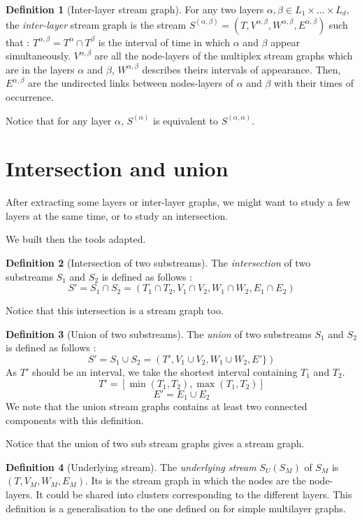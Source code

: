 \documentclass[dvipsnames,a4paper,11pt]{article}
\theoremstyle{definition}
\newtheorem{defn}{Definition}
\theoremstyle{remark}
\theoremstyle{remark}
\begin{document}
	
	\begin{defn}[Inter-layer stream graph]	
	For any two layers $\alpha, \beta \in L_1\times \dots\times L_d$, the {\em inter-layer} stream graph is the stream $S^{(\alpha,\beta)} = (T, V^{\alpha,\beta},W^{\alpha,\beta},E^{\alpha,\beta})$ such that : $T^{\alpha,\beta}=T^{\alpha}\cap T^{\beta}$ is the interval of time in which $\alpha$ and $\beta$ appear simultaneously. $V^{\alpha,\beta}$ are all the node-layers of the multiplex stream graphs which are in the layers $\alpha$ and $\beta$, $W^{\alpha,\beta}$ describes theirs intervals of appearance. Then, $E^{\alpha,\beta}$ are the undirected links between nodes-layers of $\alpha$ and $\beta$ with their times of occurrence.
	\end{defn}
	
	Notice that for any layer $\alpha$, $S^{(\alpha)}$ is equivalent to $S^{(\alpha,\alpha)}$.

	\section{Intersection and union}
	
	After extracting some layers or inter-layer graphs, we might want to study a few layers at the same time, or to study an intersection.
	
	We built then the tools adapted.
	
	\begin{defn}[Intersection of two substreams]
	The {\em intersection} of two substreams $S_1$ and $S_2$ is defined as follows :
	\[
		S' = S_1 \cap S_2 = (T_1\cap T_2, V_1 \cap V_2, W_1 \cap W_2, E_1\cap E_2)
	\]
	\end{defn}
	
	Notice that this intersection is a stream graph too.

	\begin{defn}[Union of two substreams]
	The {\em union} of two substreams $S_1$ and $S_2$ is defined as follows :
	\[
		S' = S_1 \cup S_2 = (T', V_1 \cup V_2, W_1 \cup W_2, E' \})
	\]
	As $T'$ should be an interval, we take the shortest interval containing $T_1$ and $T_2$.
	\[
		T' = [\min(T_1,T_2),\max(T_1,T_2)]
	\]
	\[
		E' = E_1 \cup E_2 
	\]
	We note that the union stream graphs contains at least two connected components with this definition.
	
	Notice that the union of two sub stream graphs gives a stream graph.
	\end{defn}
	
	
	\begin{defn}[Underlying stream]
		The {\em underlying stream } $S_U(S_M)$ of $S_M$ is $(T,V_M,W_M,E_M)$. Its is the stream graph in which the nodes are the node-layers. It could be shared into clusters corresponding to the different layers. This definition is a generalisation to the one defined on \cite{mlkiv} for simple multilayer graphs.
	\end{defn}
	
\end{document}
